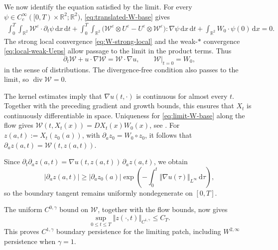 \documentclass[reqno,11pt,a4paper]{amsart}
\newcommand{\dd}{\mathrm{d}}
\begin{document}
We now identify the equation satisfied by the limit.
For every
$\psi\in C_c^\infty([0,T)\times\mathbb R^2;\mathbb R^2)$,
\eqref{eq:translated-W-base} gives
\begin{align*}
  \int_0^T\int_{\mathbb R^2}
  \mathcal W^\varepsilon\cdot\partial_t\psi\,\dd x\,\dd t
  +
  \int_0^T\int_{\mathbb R^2}
  \bigl(
    \mathcal W^\varepsilon\otimes U^\varepsilon
    -U^\varepsilon\otimes\mathcal W^\varepsilon
  \bigr):\nabla\psi\,\dd x\,\dd t
  +\int_{\mathbb R^2}W_0\cdot\psi(0)\,\dd x=0.
\end{align*}
The strong local convergence \eqref{eq:W-strong-local}
and the weak-$*$ convergence \eqref{eq:local-weak-Ueps}
allow passage to the limit in the product terms.
Thus
\begin{equation}\label{eq:limit-W-base}
  \partial_t\mathcal W+u\cdot\nabla\mathcal W
  =\mathcal W\cdot\nabla u,
  \qquad
  \mathcal W|_{t=0}=W_0,
\end{equation}
in the sense of distributions.
The divergence-free condition also passes to the limit,
so $\operatorname{div}\mathcal W=0$.

The kernel estimates imply that $\nabla u(t,\cdot)$
is continuous for almost every $t$.
Together with the preceding gradient and growth bounds,
this ensures that $X_t$ is continuously differentiable
in space.
Uniqueness for \eqref{eq:limit-W-base} along the flow gives $\mathcal W(t,X_t(x))=DX_t(x)W_0(x)$, see \cite[Lemma 1.4]{MB02}.
For $z(a,t):=X_t(z_0(a))$, with
$\partial_a z_0=W_0\circ z_0$, it follows that $\partial_a z(a,t)=\mathcal W(t,z(a,t))$. 

Since
$\partial_t\partial_a z(a,t) =\nabla u(t,z(a,t))\,\partial_a z(a,t)$, we obtain
\[
  |\partial_a z(a,t)|
  \geq |\partial_a z_0(a)|
  \exp\left(
    -\int_0^t\Vert \nabla u(\tau)\Vert _{L^\infty}\,\dd\tau
  \right),
\]
so the boundary tangent remains uniformly nondegenerate
on $[0,T]$.

The uniform $C^{0,\gamma}$ bound on $\mathcal W$,
together with the flow bounds, now gives
\begin{equation}\label{eq:limit-C1gamma}
  \sup_{0\leq t\leq T}
  \Vert z(\cdot,t)\Vert _{C^{1,\gamma}}
  \leq C_T.
\end{equation}
This proves $C^{1,\gamma}$ boundary persistence
for the limiting patch, including
$W^{2,\infty}$ persistence when $\gamma=1$.
\end{document}
